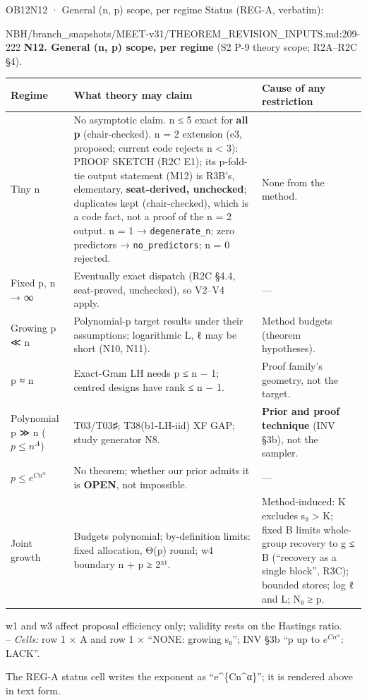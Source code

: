 \begin{card}{OB12}{N12 · General (n, p) scope, per regime}
Status (REG-A, verbatim):  
\begin{stmt}{NBH/branch_snapshots/MEET-v31/THEOREM_REVISION_INPUTS.md:209-222}
\textbf{N12. General (n, p) scope, per regime} (S2 P-9 theory scope; R2A–R2C §4).\par
{\footnotesize
\begin{tabular}{@{}>{\raggedright\arraybackslash}p{2.3cm}>{\raggedright\arraybackslash}p{8.1cm}>{\raggedright\arraybackslash}p{3.6cm}@{}}
\toprule
Regime & What theory may claim & Cause of any restriction\\
\midrule
Tiny n & No asymptotic claim. n ≤ 5 exact for \textbf{all p} (chair-checked). n = 2 extension (e3, proposed; current code rejects n < 3): PROOF SKETCH (R2C E1); its p-fold-tie output statement (M12) is R3B's, elementary, \textbf{seat-derived, unchecked}; duplicates kept (chair-checked), which is a code fact, not a proof of the n = 2 output. n = 1 → \texttt{degenerate\_n}; zero predictors → \texttt{no\_predictors}; n = 0 rejected. & None from the method.\\
Fixed p, n → ∞ & Eventually exact dispatch (R2C §4.4, seat-proved, unchecked), so V2–V4 apply. & —\\
Growing p ≪ n & Polynomial-p target results under their assumptions; logarithmic L, ℓ may be short (N10, N11). & Method budgets (theorem hypotheses).\\
p ≈ n & Exact-Gram LH needs p ≤ n − 1; centred designs have rank ≤ n − 1. & Proof family's geometry, not the target.\\
Polynomial p ≫ n ($p ≤ n^A$) & T03/T03♯; T38(b1-LH-iid) XF GAP; study generator N8. & \textbf{Prior and proof technique} (INV §3b), not the sampler.\\
$p ≤ e^{Cn^α}$ & No theorem; whether our prior admits it is \textbf{OPEN}, not impossible. & —\\
Joint growth & Budgets polynomial; by-definition limits: fixed allocation, Θ(p) round; w4 boundary n + p ≥ 2³¹. & Method-induced: K excludes s₀ > K; fixed B limits whole-group recovery to g ≤ B (``recovery as a single block'', R3C); bounded stores; log ℓ and L; N₀ ≥ p.\\
\bottomrule
\end{tabular}}\par
w1 and w3 affect proposal efficiency only; validity rests on the Hastings ratio.\\
– \emph{Cells:} row 1 × A and row 1 × ``NONE: growing s₀''; INV §3b ``p up to $e^{Cn^α}$: LACK''.
\end{stmt}
The REG-A status cell writes the exponent as ``e\^{}\{Cn\^{}α\}''; it is rendered above in text form.


\end{card}
